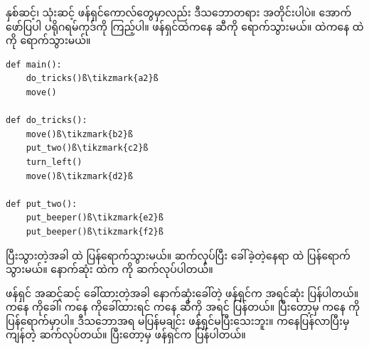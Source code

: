 နှစ်ဆင့်၊ သုံးဆင့် ဖန်ရှင်ကောလ်တွေမှာလည်း ဒီသဘောတရား အတိုင်းပါပဲ။ အောက်ဖော်ပြပါ ပရိုဂရမ်ကုဒ်ကို ကြည့်ပါ။  ဖန်ရှင်ထဲကနေ  ဆီကို ရောက်သွားမယ်။  ထဲကနေ  ထဲကို ရောက်သွားမယ်။ 
%
\setlength{\fboxsep}{0pt}
\begin{verbatim}
def main():
    do_tricks()ß\tikzmark{a2}ß
    move()

def do_tricks():
    move()ß\tikzmark{b2}ß
    put_two()ß\tikzmark{c2}ß
    turn_left()
    move()ß\tikzmark{d2}ß

def put_two():
    put_beeper()ß\tikzmark{e2}ß
    put_beeper()ß\tikzmark{f2}ß
\end{verbatim}
%
 ပြီးသွားတဲ့အခါ  ထဲ ပြန်ရောက်သွားမယ်။ \fEn{,}  ဆက်လုပ်ပြီး  ခေါ်ခဲ့တဲ့နေရာ  ထဲ ပြန်ရောက်သွားမယ်။ နောက်ဆုံး  ထဲက   ကို ဆက်လုပ်ပါတယ်။

ဖန်ရှင် အဆင့်ဆင့် ခေါ်ထားတဲ့အခါ နောက်ဆုံးခေါ်တဲ့ ဖန်ရှင်က အရင်ဆုံး  ပြန်ပါတယ်။  ကနေ  ကိုခေါ်၊  ကနေ  ကိုခေါ်ထားရင်  ကနေ  ဆီကို အရင်  ပြန်တယ်။ ပြီးတော့မှ  ကနေ  ကို ပြန်ရောက်မှာပါ။ ဒီသဘောအရ   မပြန်မချင်း  ဖန်ရှင်မပြီးသေးဘူး။  ကနေပြန်လာပြီးမှ ကျန်တဲ့ \fEn{,}  ဆက်လုပ်တယ်။ ပြီးတော့မှ  ဖန်ရှင်က  ပြန်ပါတယ်။ 


